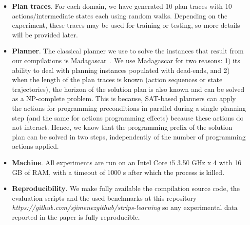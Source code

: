 \begin{itemize}

\item {\bf Plan traces}. For each domain, we have generated 10 plan traces with 10 actions/intermediate states each using random walks. Depending on the experiment, these traces may be used for training or testing, so more details will be provided later.

\item {\bf Planner}. The classical planner we use to solve the instances that result from our compilations is {\sc Madagascar}~\cite{rintanen2014madagascar}. We use {\sc Madagascar} for two reasons: 1) its ability to deal with planning instances populated with dead-ends, and 2) when the length of the plan traces is known (\FO action sequences or \FO state trajectories), the horizon of the solution plan is also known and can be solved as a NP-complete problem. This is because, SAT-based planners can apply the actions for programming preconditions in parallel during a single planning step (and the same for actions programming effects) because these actions do not interact. Hence, we know that the programming prefix of the solution plan can be solved in two steps, independently of the number of programming actions applied.

\item {\bf Machine}. All experiments are run on an Intel Core i5 3.50 GHz x 4 with 16 GB of RAM, with a timeout of 1000 s after which the process is killed.

\item {\bf Reproducibility}. We make fully available the compilation source code, the evaluation scripts and the used benchmarks at this repository {\em https://github.com/sjimenezgithub/strips-learning} so any experimental data reported in the paper is fully reproducible.
\end{itemize}

